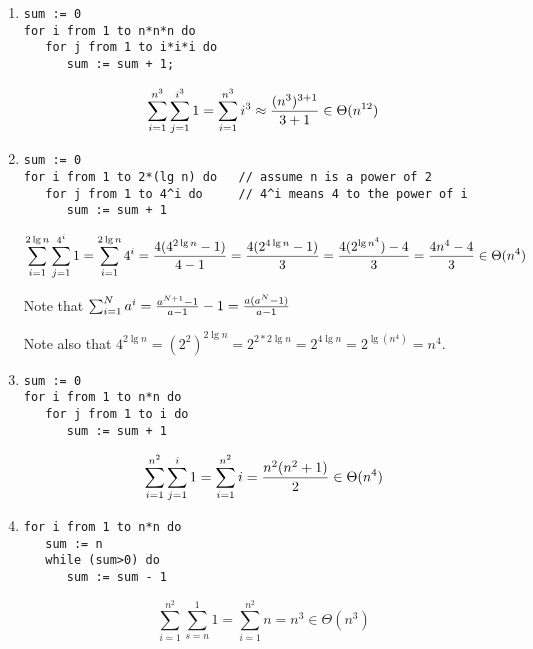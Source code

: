 \begin{enumerate}

\item
\begin{verbatim}
sum := 0
for i from 1 to n*n*n do
   for j from 1 to i*i*i do
      sum := sum + 1;
\end{verbatim}

\begin{solution}
$$\sum_{i=1}^{n^3} \sum_{j=1}^{i^3} 1
= \sum_{i=1}^{n^3} i^3
\approx { (n^3)^{3+1} \over 3+1 }
\in \Theta(n^{12})$$
\end{solution}

\item
\begin{verbatim}
sum := 0
for i from 1 to 2*(lg n) do   // assume n is a power of 2
   for j from 1 to 4^i do     // 4^i means 4 to the power of i
      sum := sum + 1
\end{verbatim}

\begin{solution}
$$\sum_{i=1}^{2\lg n} \sum_{j=1}^{4^i} 1
= \sum_{i=1}^{2\lg n} 4^i
= {  4(4^{2\lg n} - 1)  \over  4-1 }
= {  4(2^{4\lg n} - 1)  \over 3}
= {  4(2^{\lg n^4}) - 4 \over 3}
= {  4n^4 - 4 \over 3}
\in \Theta(n^4)$$

Note that $\sum_{i=1}^{N} a^i = {a^{N+1} - 1 \over a-1} - 1 = { a(a^N -1) \over a-1}$

Note also that
$4^{2\lg n}
= (2^2)^{2\lg n}
= 2^{2*2\lg n}
= 2^{4\lg n}
= 2^{\lg( n^4 ) }
= n^4$.

\end{solution}

\item
\begin{verbatim}
sum := 0
for i from 1 to n*n do
   for j from 1 to i do
      sum := sum + 1
\end{verbatim}

\begin{solution}
$$\sum_{i=1}^{n^2} \sum_{j=1}^i 1 = \sum_{i=1}^{n^2} i = {n^2(n^2 + 1) \over 2} \in
\Theta(n^4)$$
\end{solution}

\item
\begin{verbatim}
for i from 1 to n*n do
   sum := n
   while (sum>0) do
      sum := sum - 1
\end{verbatim}


\begin{solution}
$$\sum_{i=1}^{n^2} \sum_{s=n}^1 1 = \sum_{i=1}^{n^2} n = n^3 \in \Theta(n^3)$$
\end{solution}


\end{enumerate}

